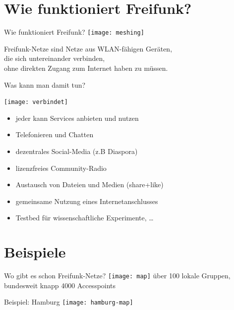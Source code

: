 \documentclass{beamer}
\begin{document}
\section{Wie funktioniert Freifunk?}
\begin{frame}{Wie funktioniert Freifunk?}
\vfill
\centering
\texttt{[image: meshing]}

Freifunk-Netze sind Netze aus WLAN-fähigen Geräten,\\ die sich untereinander verbinden,\\ ohne direkten Zugang zum Internet haben zu müssen.
\vfill
\end{frame}

\begin{frame}{Was kann man damit tun?}
\vfill
\begin{center}
\texttt{[image: verbindet]}
\end{center}

\begin{itemize}
\pause\item jeder kann Services anbieten und nutzen
\pause\item Telefonieren und Chatten
\pause\item dezentrales Social-Media (z.B Diaspora)
\pause\item lizenzfreies Community-Radio
\pause\item Austausch von Dateien und Medien (share+like)
\pause\item gemeinsame Nutzung eines Internetanschlusses
\pause\item Testbed f\"ur wissenschaftliche Experimente, \ldots
\end{itemize}
\vfill
\end{frame}

\section{Beispiele}
\begin{frame}{Wo gibt es schon Freifunk-Netze?}
\vfill
\centering
\texttt{[image: map]}
\vfill
über 100 lokale Gruppen, bundesweit knapp 4000 Accesspoints
\vfill
\end{frame}

\begin{frame}{Beispiel: Hamburg}
\vfill
\centering
\texttt{[image: hamburg-map]}
\vfill
\end{frame}
\end{document}
